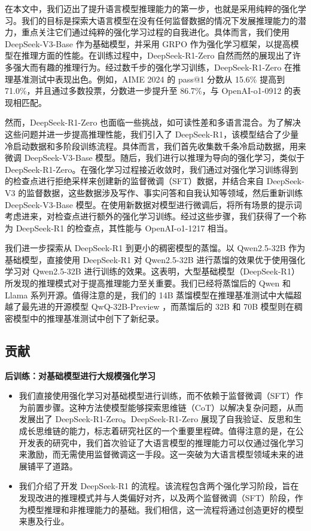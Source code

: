 \documentclass[lang=cn,a4paper,newtx]{elegantpaper}
\newcommand{\dsri}{DeepSeek-R1}
\newcommand{\dsro}{DeepSeek-R1-Zero}
\begin{document}
在本文中，我们迈出了提升语言模型推理能力的第一步，也就是采用纯粹的强化学习。我们的目标是探索大语言模型在没有任何监督数据的情况下发展推理能力的潜力，重点关注它们通过纯粹的强化学习过程的自我进化。具体而言，我们使用 DeepSeek-V3-Base 作为基础模型，并采用 GRPO 作为强化学习框架，以提高模型在推理方面的性能。在训练过程中，\dsro{} 自然而然的展现出了许多强大而有趣的推理行为。经过数千步的强化学习训练，\dsro{} 在推理基准测试中表现出色。例如，AIME 2024 的 pass@1 分数从 15.6\% 提高到 71.0\%，并且通过多数投票，分数进一步提升至 86.7\%，与 OpenAI-o1-0912 的表现相匹配。

然而，\dsro{} 也面临一些挑战，如可读性差和多语言混合。为了解决这些问题并进一步提高推理性能，我们引入了 \dsri{}，该模型结合了少量冷启动数据和多阶段训练流程。具体而言，我们首先收集数千条冷启动数据，用来微调 DeepSeek-V3-Base 模型。随后，我们进行以推理为导向的强化学习，类似于 \dsro{}。在强化学习过程接近收敛时，我们通过对强化学习训练得到的检查点进行拒绝采样来创建新的监督微调（SFT）数据，并结合来自 DeepSeek-V3 的监督数据，这些数据涉及写作、事实问答和自我认知等领域，然后重新训练 DeepSeek-V3-Base 模型。在使用新数据对模型进行微调后，将所有场景的提示词考虑进来，对检查点进行额外的强化学习训练。经过这些步骤，我们获得了一个称为 \dsri{} 的检查点，其性能与 OpenAI-o1-1217 相当。

我们进一步探索从 \dsri{} 到更小的稠密模型的蒸馏。以 Qwen2.5-32B 作为基础模型，直接使用 DeepSeek-R1 对 Qwen2.5-32B 进行蒸馏的效果优于使用强化学习对 Qwen2.5-32B 进行训练的效果。这表明，大型基础模型（\dsri{}）所发现的推理模式对于提高推理能力至关重要。我们已经将蒸馏后的 Qwen 和 Llama 系列开源。值得注意的是，我们的 14B 蒸馏模型在推理基准测试中大幅超越了最先进的开源模型 QwQ-32B-Preview ，而蒸馏后的 32B 和 70B 模型则在稠密模型中的推理基准测试中创下了新纪录。

\subsection{贡献}

\textbf{后训练：对基础模型进行大规模强化学习}

\begin{itemize}
  \item 我们直接使用强化学习对基础模型进行训练，而不依赖于监督微调（SFT）作为前置步骤。这种方法使模型能够探索思维链（CoT）以解决复杂问题，从而发展出了 \dsro{}。\dsro{} 展现了自我验证、反思和生成长思维链的能力，标志着研究社区的一个重要里程碑。值得注意的是，在公开发表的研究中，我们首次验证了大语言模型的推理能力可以仅通过强化学习来激励，而无需使用监督微调这一手段。这一突破为大语言模型领域未来的进展铺平了道路。
  \item 我们介绍了开发 \dsri{} 的流程。该流程包含两个强化学习阶段，旨在发现改进的推理模式并与人类偏好对齐，以及两个监督微调（SFT）阶段，作为模型推理和非推理能力的基础。我们相信，这一流程将通过创造更好的模型来惠及行业。
\end{itemize}
\end{document}
